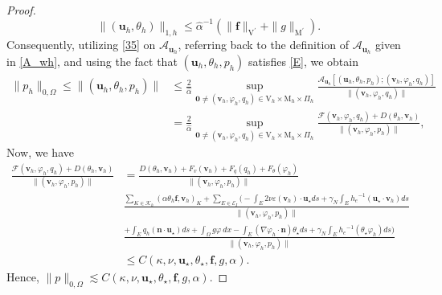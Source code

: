 \documentclass[10pt,a4paper]{article}
\begin{document}
\begin{proof}
  			$$
  			\|(\boldsymbol{u}_h, \theta_h)\|_{1,h} \leq {\hat{\alpha}}^{-1}( \|\boldsymbol{f}\|_{\mathrm{V}^{\prime}} + \|g\|_{\mathrm{M}^{\prime}}).
  			$$
  			Consequently, utilizing \eqref{35} on $\mathcal{A}_{\boldsymbol{u}_h}$, referring back to the definition of $\mathcal{A}_{\boldsymbol{u}_h}$ given in \eqref{A_wh}, and using the fact that $( \boldsymbol{u}_h,\theta_h,p_h)$ satisfies \eqref{E}, we obtain
            \begin{align*}
                \|p_h\|_{0,\Omega}\leq\|( \boldsymbol{u}_h,\theta_h,p_h)\| &\leq \frac{2}{\hat{\alpha}} \sup _{\boldsymbol{0} \neq( \boldsymbol{v}_h,\varphi_h,q_h) \in \mathrm{V}_h \times \mathrm{M}_h \times \Pi_h} \frac{\mathcal{A}_{\boldsymbol{u}_h}\left[(\boldsymbol{u}_h,\theta_h,p_h);(\boldsymbol{v}_h,\varphi_h,q_h)\right]}{\|( \boldsymbol{v}_h,\varphi_h,q_h)\|} \\ & =\frac{2}{\hat{\alpha}} \sup _{\boldsymbol{0} \neq( \boldsymbol{v}_h,\varphi_h,q_h) \in \mathrm{V}_h \times \mathrm{M}_h \times \Pi_h} \frac{\mathcal{F}(\boldsymbol{v}_h, \varphi_h, q_h) + D(\theta_h,\boldsymbol{v}_h)}{\|( \boldsymbol{v}_h,\varphi_h,p_h)\|},
            \end{align*}
            Now, we have 
            \begin{align*}
        \frac{\mathcal{F}(\boldsymbol{v}_h, \varphi_h, q_h) + D(\theta_h,\boldsymbol{v}_h)}{\|( \boldsymbol{v}_h,\varphi_h,p_h)\|} & =    \frac{D(\theta_h,\boldsymbol{v}_h)+F_v(\boldsymbol{v}_h) + F_q(q_h) + F_{\theta}(\varphi_h)}{\|( \boldsymbol{v}_h,\varphi_h,p_h)\|} \\ & \frac{\sum_{K\in \mathcal{K}_{h}} (\alpha \theta_h \boldsymbol{f}, \boldsymbol{v}_h)_K +\sum_{E\in \mathcal{E}_I}\bigg(-\int_{E} 2 \nu \varepsilon(\boldsymbol{v}_h) \cdot \boldsymbol{u}_{\star} d s + \gamma_N \int_{E} {h_e}^{-1}(\boldsymbol{u}_{\star} \cdot \boldsymbol{v}_h) d s }{\|( \boldsymbol{v}_h,\varphi_h,p_h)\|}
        \\ & \frac{ + \int_{E} q_h (\boldsymbol{n} \cdot \boldsymbol{u}_{\star}) d s +\int_{\Omega} g \varphi~ dx  -\int_{E} (\nabla \varphi_h \cdot \boldsymbol{n}) \theta_{\star} d s +\gamma_N \int_{E} {h_e}^{-1}(\theta_{\star} \varphi_h)d s \bigg)}{\|( \boldsymbol{v}_h,\varphi_h,p_h)\|} \\ & \leq C(\kappa, \nu, \boldsymbol{u}_{\star}, \theta_{\star}, \boldsymbol{f}, g, \alpha).
            \end{align*}
            Hence, $\|p\|_{0,\Omega} \lesssim C(\kappa, \nu, \boldsymbol{u}_{\star}, \theta_{\star}, \boldsymbol{f}, g, \alpha). $
  		\end{proof}
\end{document}
